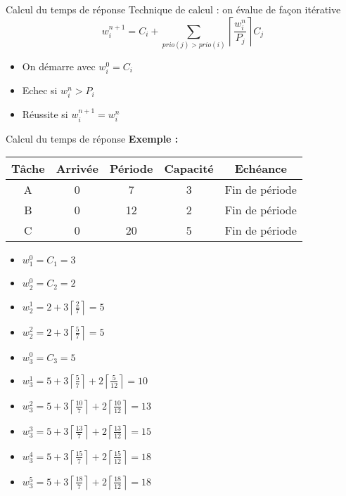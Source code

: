 \begin{frame}{Calcul du temps de réponse}
  Technique de calcul : on évalue de façon itérative
  $$w_i^{n+1}=C_i+\sum_{prio(j) > prio(i)} \left\lceil\frac{w_i^n}{P_j}\right\rceil C_j$$

  \begin{itemize}
    \item On démarre avec $w_i^0 = C_i$
    \item Echec si $w_i^n > P_i$
    \item Réussite si $w_i^{n+1} = w_i^n$
  \end{itemize}
\end{frame} 

\begin{frame}{Calcul du temps de réponse}
  \textbf{Exemple :}
    \begin{center}
      \begin{tabular}{ccccc}
        \hline
        Tâche & Arrivée & Période & Capacité & Echéance \\
        \hline
        A & 0 &  7 & 3 & Fin de période\\
        B & 0 & 12 & 2 & Fin de période\\
        C & 0 & 20 & 5 & Fin de période\\
        \hline
      \end{tabular}
    \end{center}
    \begin{itemize} 
      \item $w_1^0 = C_1 = 3$
      \item $w_2^0 = C_2 = 2$
      \item $w_2^1 = 2 + 3 \left\lceil\frac{2}{7}\right\rceil = 5$
      \item $w_2^2 = 2 + 3 \left\lceil\frac{5}{7}\right\rceil = 5$
      \item $w_3^0 = C_3 = 5$
      \item $w_3^1 = 5 + 3 \left\lceil\frac{5}{7}\right\rceil + 2 \left\lceil\frac{5}{12}\right\rceil = 10$
      \item $w_3^2 = 5 + 3 \left\lceil\frac{10}{7}\right\rceil + 2 \left\lceil\frac{10}{12}\right\rceil = 13$
      \item $w_3^3 = 5 + 3 \left\lceil\frac{13}{7}\right\rceil + 2 \left\lceil\frac{13}{12}\right\rceil = 15$
      \item $w_3^4 = 5 + 3 \left\lceil\frac{15}{7}\right\rceil + 2 \left\lceil\frac{15}{12}\right\rceil = 18$
      \item $w_3^5 = 5 + 3 \left\lceil\frac{18}{7}\right\rceil + 2 \left\lceil\frac{18}{12}\right\rceil = 18$
      \end{itemize} 
\end{frame}

